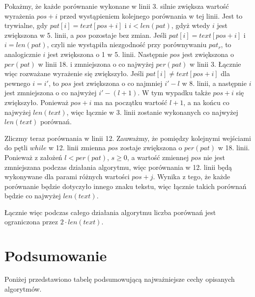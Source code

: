 Pokażmy, że każde porównanie wykonane w linii 3. silnie zwiększa wartość wyrażenia $pos+i$ przed wystąpieniem kolejnego porównania w tej linii. Jest to trywialne, gdy $pat[i]=text[pos+i]$ i $i < len(pat)$, gdyż wtedy $i$ jest zwiększona w 5. linii, a $pos$ pozostaje bez zmian. Jeśli $pat[i]=text[pos+i]$ i $i = len(pat)$, czyli nie wystąpiła niezgodność przy porównywaniu $pat_{r}$, to analogicznie $i$ jest zwiększona o 1 w 5. linii. Następnie $pos$ jest zwiększona o $per(pat)$ w linii 18. i zmniejszona o co najwyżej $per(pat)$ w linii 3. Łącznie więc rozważane wyrażenie się zwiększyło. Jeśli $pat[i] \neq text[pos+i]$ dla pewnego $i = i'$, to $pos$ jest zwiększona o co najmniej $i'-l$ w 8. linii, a następnie $i$ jest zmniejszona o co najwyżej $i'-(l+1)$. W tym wypadku także $pos+i$ się zwiększyło. Ponieważ $pos+i$ ma na początku wartość $l+1$, a na końcu co najwyżej $len(text)$, więc łącznie w 3. linii zostanie wykonanych co najwyżej $len(text)$ porównań.

Zliczmy teraz porównania w linii 12. Zauważmy, że pomiędzy kolejnymi wejściami do pętli $while$ w 12. linii zmienna $pos$ zostaje zwiększona o $per(pat)$ w 18. linii. Ponieważ z założeń $l<per(pat)$, $s \geq 0$, a wartość zmiennej $pos$ nie jest zmniejszana podczas działania algorytmu, więc porównania w 12. linii będą wykonywane dla parami różnych wartości $pos+j$. Wynika z tego, że każde porównanie będzie dotyczyło innego znaku tekstu, więc łącznie takich porównań będzie co najwyżej $len(text)$.

Łącznie więc podczas całego działania algorytmu liczba porównań jest ograniczona przez $2 \cdot len(text)$.

\newpage
\section{Podsumowanie}
Poniżej przedstawiono tabelę podsumowującą najważniejsze cechy opisanych algorytmów.

